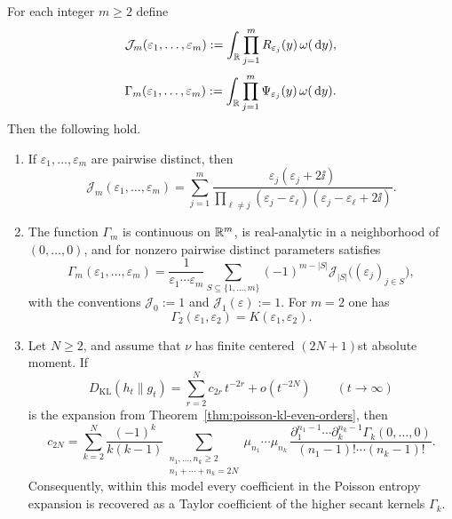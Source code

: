 \begin{theorem}
\label{thm:higher-secant-kernels}
For each integer $m\ge 2$ define
\[
\mathcal J_m(\varepsilon_1,\dots,\varepsilon_m)
:=
\int_{\mathbb{R}}\prod_{j=1}^m R_{\varepsilon_j}(y)\,\omega(\,\mathrm{d} y),
\]
\[
\Gamma_m(\varepsilon_1,\dots,\varepsilon_m)
:=
\int_{\mathbb{R}}\prod_{j=1}^m \Psi_{\varepsilon_j}(y)\,\omega(\,\mathrm{d} y).
\]
Then the following hold.
\begin{enumerate}[label=(\roman*)]
\item If $\varepsilon_1,\dots,\varepsilon_m$ are pairwise distinct, then
      \begin{equation}\label{eq:higher-secant-residue}
      \mathcal J_m(\varepsilon_1,\dots,\varepsilon_m)
      =
      \sum_{j=1}^m
      \frac{\varepsilon_j(\varepsilon_j+2\ii)}
      {\displaystyle\prod_{\ell\ne j}
      (\varepsilon_j-\varepsilon_\ell)
      (\varepsilon_j-\varepsilon_\ell+2\ii)}.
      \end{equation}
\item The function $\Gamma_m$ is continuous on $\mathbb{R}^m$, is
      real-analytic in a neighborhood of $(0,\dots,0)$, and for
      nonzero pairwise distinct parameters satisfies
      \begin{equation}\label{eq:higher-secant-inclusion-exclusion}
      \Gamma_m(\varepsilon_1,\dots,\varepsilon_m)
      =
      \frac{1}{\varepsilon_1\cdots\varepsilon_m}
      \sum_{S\subseteq\{1,\dots,m\}}(-1)^{m-|S|}
      \mathcal J_{|S|}\bigl((\varepsilon_j)_{j\in S}\bigr),
      \end{equation}
      with the conventions $\mathcal J_0:=1$ and
      $\mathcal J_1(\varepsilon):=1$.  For $m=2$ one has
      \[
      \Gamma_2(\varepsilon_1,\varepsilon_2)=K(\varepsilon_1,\varepsilon_2).
      \]
\item Let $N\ge 2$, and assume that $\nu$ has finite centered
      $(2N+1)$st absolute moment.  If
      \[
      D_{\mathrm{KL}}(h_t\|g_t)
      =\sum_{r=2}^{N}c_{2r}\,t^{-2r}+o(t^{-2N})
      \qquad(t\to\infty)
      \]
      is the expansion from
      Theorem~\ref{thm:poisson-kl-even-orders}, then
      \begin{equation}\label{eq:higher-secant-coefficients}
      c_{2N}
      =
      \sum_{k=2}^{N}\frac{(-1)^k}{k(k-1)}
      \sum_{\substack{n_1,\dots,n_k\ge 2\\n_1+\cdots+n_k=2N}}
      \mu_{n_1}\cdots\mu_{n_k}\,
      \frac{
      \partial_1^{n_1-1}\cdots \partial_k^{n_k-1}
      \Gamma_k(0,\dots,0)}
      {(n_1-1)!\cdots(n_k-1)!}.
      \end{equation}
      Consequently, within this model every coefficient in the Poisson
      entropy expansion is recovered as a Taylor coefficient of the
      higher secant kernels $\Gamma_k$.
\end{enumerate}
\end{theorem}

